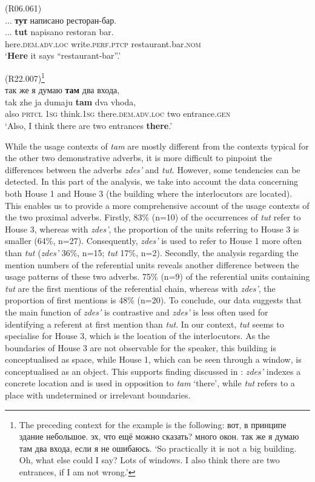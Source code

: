 \documentclass[output=paper,colorlinks,citecolor=brown]{langscibook}
\begin{document}
\ea\label{ex:nahkola:2} (R06.061)\\
{... \textbf{{тут}} {написано ресторан-бар.}}\\
\gll ... \textbf{tut} napisano {restoran bar}.\\
     {} here.\textsc{dem.adv.loc} write.\textsc{perf.ptcp} restaurant.bar.\textsc{nom}\\
\glt ‘\textbf{Here} it says “restaurant-bar”.’ 
\z

\ea\label{ex:nahkola:3} (R22.007)\footnote{The preceding context for the example is the following: {вот, в принципе здание небольшое. эх, что ещё можно сказать? много окон. так же я думаю там два входа, если я не ошибаюсь.} ‘So practically it is not a big building. Oh, what else could I say? Lots of windows. I also think there are two entrances, if I am not wrong.’}\\
{{так} {же} {я} {думаю} \textbf{{там}} {два} {входа},} \\
\gll tak zhe ja dumaju \textbf{tam} dva vhoda,\\
     also \textsc{prtcl} \textsc{1sg} think.\textsc{1sg} there.\textsc{dem.adv.loc} two entrance.\textsc{gen}\\
\glt ‘Also, I think there are two entrances \textbf{there}.’ 
\z

While the usage contexts of \textit{tam} are mostly different from the contexts typical for the other two demonstrative adverbs, it is more difficult to pinpoint the differences between the adverbs \textit{zdes’} and \textit{tut}. However, some tendencies can be detected. In this part of the analysis, we take into account the data concerning both House 1 and House 3 (the building where the interlocutors are located). This enables us to provide a more comprehensive account of the usage contexts of the two proximal adverbs. Firstly, 83\% (n=10) of the occurrences of \textit{tut} refer to House 3, whereas with \textit{zdes’}, the proportion of the units referring to House 3 is smaller (64\%, n=27). Consequently, \textit{zdes’} is used to refer to House 1 more often than \textit{tut} (\textit{zdes’} 36\%, n=15; \textit{tut} 17\%, n=2). Secondly, the analysis regarding the mention numbers of the referential units reveals another difference between the usage patterns of these two adverbs. 75\% (n=9) of the referential units containing \textit{tut} are the first mentions of the referential chain, whereas with \textit{zdes’}, the proportion of first mentions is 48\% (n=20). To conclude, our data suggests that the main function of \textit{zdes’} is contrastive and \textit{zdes’} is less often used for identifying a referent at first mention than \textit{tut}. In our context, \textit{tut} seems to specialise for House 3, which is the location of the interlocutors. As the boundaries of House 3 are not observable for the speaker, this building is conceptualised as space, while House 1, which can be seen through a window, is conceptualised as an object. This supports  finding discussed in : \textit{zdes’} indexes a concrete location and is used in opposition to \textit{tam} ‘there’, while \textit{tut} refers to a place with undetermined or irrelevant boundaries.
\end{document}
